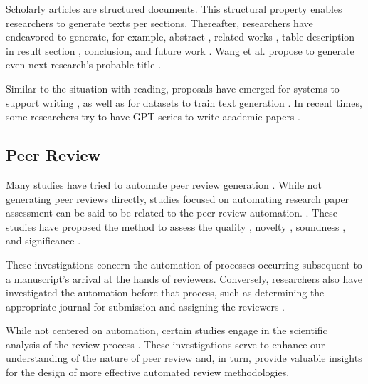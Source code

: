 Scholarly articles are structured documents. This structural property enables researchers to generate texts per sections. Thereafter, 
researchers have endeavored to generate, for example, abstract \cite{kumarasinghe2022automatic,gao2022comparing,wang2019paperrobot}, related works \cite{li2022automatic,shah2021generating}, table description in result section \cite{moosavi2021scigen,moosavi2021learning}, conclusion, and future work \cite{wang2019paperrobot}. Wang et al. propose to generate even next research's probable title \cite{wang2019paperrobot}.

Similar to the situation with reading, proposals have emerged for systems to support writing \cite{narimatsu2021task}, as well as for datasets to train text generation \cite{chen2021scixgen}. In recent times, some researchers try to have GPT series to write academic papers \cite{transformer2022can}. 

\subsection{Peer Review}
Many studies have tried to automate peer review generation \cite{thelwall2019artificial,li2019generating,schulz2022future,yuan2022can,yuan2022kid,lin2021automated1,lin2021automated2,kumar2022investigations,bharti2022can,uban2021generating,wang2020reviewrobot}. While not generating peer reviews directly, studies focused on automating research paper assessment  can be said to be related to the peer review automation. \cite{kousha2022artificial,li2020multi,huang2018deep}. These studies have proposed the method to assess the quality \cite{thelwall2022predicting,thelwall2022can}, novelty \cite{pelletier2022novelpy,amplayo2019evaluating,shibayama2020measuring}, soundness \cite{cabanac2022decontamination}, and significance \cite{zong2022citation,xia2023review,soni2022predicting,manghi2021new,soni2021follow,van2020schubert,mckeown2016predicting}.

These investigations concern the automation of processes occurring subsequent to a manuscript's arrival at the hands of reviewers. Conversely, researchers also have investigated the automation before that process, such as determining the appropriate journal for submission \cite{michail2023journal} and assigning the reviewers \cite{zhao2022reviewer}.

While not centered on automation, certain studies engage in the scientific analysis of the review process \cite{shah2022challenges,verma2021attend,bharti2022confident,bharti2022betterpr,verma2022lack,kennard2022disapere}. These investigations serve to enhance our understanding of the nature of peer review and, in turn, provide valuable insights for the design of more effective automated review methodologies. 

